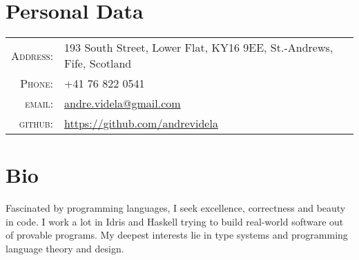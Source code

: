 \documentclass[a4paper,10pt]{article} %
\begin{document}
\pagestyle{empty} %


\par{\bigskip\par} %
\par{\bigskip\par} %
\section{Personal Data}

\begin{tabular}{rl}
\textsc{Address:} & 193 South Street, Lower Flat, KY16 9EE, St.-Andrews, Fife, Scotland \\
\textsc{Phone:} & +41 76 822 0541\\
\textsc{email:} & \href{mailto:andre.videla@gmail.com}{andre.videla@gmail.com}\\
\textsc{github:} & \href{https://github.com/andrevidela}{https://github.com/andrevidela}
\end{tabular}


\section{Bio}
Fascinated by programming languages, I seek excellence, 
correctness and beauty in code. I work a lot in Idris and Haskell
 trying to build real-world software out of provable programs. My
  deepest interests lie in type systems and programming language 
  theory and design.


\end{document}
